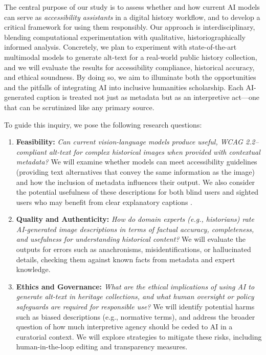 \documentclass{anthology-ch}         %
\begin{document}
The central purpose of our study is to assess whether and how current AI models can serve as \emph{accessibility assistants} in a digital history workflow, and to develop a critical framework for using them responsibly. Our approach is interdisciplinary, blending computational experimentation with qualitative, historiographically informed analysis. Concretely, we plan to experiment with state-of-the-art multimodal models to generate alt-text for a real-world public history collection, and we will evaluate the results for accessibility compliance, historical accuracy, and ethical soundness. By doing so, we aim to illuminate both the opportunities and the pitfalls of integrating AI into inclusive humanities scholarship. Each AI-generated caption is treated not just as metadata but as an interpretive act---one that can be scrutinized like any primary source.

To guide this inquiry, we pose the following research questions:

\begin{enumerate}
    \item \textbf{Feasibility:} \emph{Can current vision-language models produce useful, WCAG 2.2–compliant alt-text for complex historical images when provided with contextual metadata?} We will examine whether models can meet accessibility guidelines (providing text alternatives that convey the same information as the image) and how the inclusion of metadata influences their output. We also consider the potential usefulness of these descriptions for both blind users and sighted users who may benefit from clear explanatory captions \autocite{cecilia2023b}.
    \item \textbf{Quality and Authenticity:} \emph{How do domain experts (e.g., historians) rate AI-generated image descriptions in terms of factual accuracy, completeness, and usefulness for understanding historical content?} We will evaluate the outputs for errors such as anachronisms, misidentifications, or hallucinated details, checking them against known facts from metadata and expert knowledge.
    \item \textbf{Ethics and Governance:} \emph{What are the ethical implications of using AI to generate alt-text in heritage collections, and what human oversight or policy safeguards are required for responsible use?} We will identify potential harms such as biased descriptions (e.g., normative terms), and address the broader question of how much interpretive agency should be ceded to AI in a curatorial context. We will explore strategies to mitigate these risks, including human-in-the-loop editing and transparency measures.
\end{enumerate}
\end{document}
